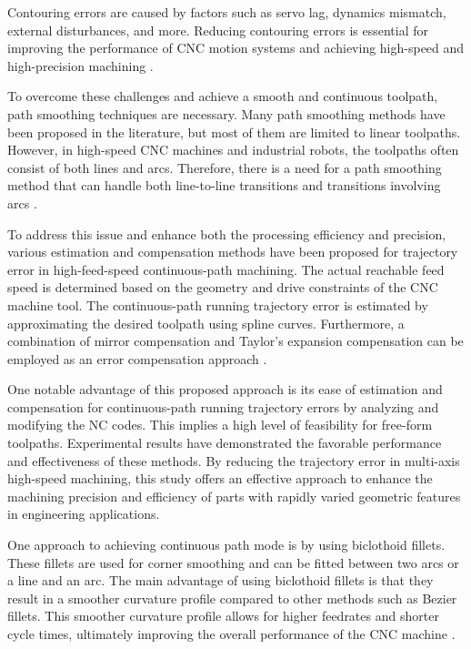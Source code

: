 Contouring errors are caused by factors such as servo lag, dynamics mismatch, external disturbances, and more. Reducing contouring errors is essential for improving the performance of CNC motion systems and achieving high-speed and high-precision machining \cite{Jia.2018}. 

To overcome these challenges and achieve a smooth and continuous toolpath, path smoothing techniques are necessary. Many path smoothing methods have been proposed in the literature, but most of them are limited to linear toolpaths. However, in high-speed CNC machines and industrial robots, the toolpaths often consist of both lines and arcs. Therefore, there is a need for a path smoothing method that can handle both line-to-line transitions and transitions involving arcs \cite{Shahzadeh.2018}.  


To address this issue and enhance both the processing efficiency and precision, various estimation and compensation methods have been proposed for trajectory error in high-feed-speed continuous-path machining. The actual reachable feed speed is determined based on the geometry and drive constraints of the CNC machine tool. The continuous-path running trajectory error is estimated by approximating the desired toolpath using spline curves. Furthermore, a combination of mirror compensation and Taylor's expansion compensation can be employed as an error compensation approach \cite{Jia.2018}.

One notable advantage of this proposed approach is its ease of estimation and compensation for continuous-path running trajectory errors by analyzing and modifying the NC codes. This implies a high level of feasibility for free-form toolpaths. Experimental results have demonstrated the favorable performance and effectiveness of these methods. By reducing the trajectory error in multi-axis high-speed machining, this study offers an effective approach to enhance the machining precision and efficiency of parts with rapidly varied geometric features in engineering applications. \cite{Song.2017}


One approach to achieving continuous path mode is by using biclothoid fillets. These fillets are used for corner smoothing and can be fitted between two arcs or a line and an arc. The main advantage of using biclothoid fillets is that they result in a smoother curvature profile compared to other methods such as Bezier fillets. This smoother curvature profile allows for higher feedrates and shorter cycle times, ultimately improving the overall performance of the CNC machine \cite{Shahzadeh.2018}.  



